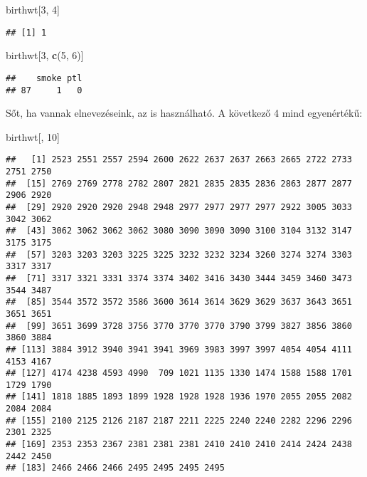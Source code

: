 \documentclass[]{book}
\newenvironment{Shaded}{\begin{snugshade}}{\end{snugshade}}
\newcommand{\DecValTok}[1]{\textcolor[rgb]{0.00,0.00,0.81}{#1}}
\newcommand{\KeywordTok}[1]{\textcolor[rgb]{0.13,0.29,0.53}{\textbf{#1}}}
\newcommand{\NormalTok}[1]{#1}
\begin{document}
\begin{Shaded}
\begin{Highlighting}[]
\NormalTok{birthwt[}\DecValTok{3}\NormalTok{, }\DecValTok{4}\NormalTok{]}
\end{Highlighting}
\end{Shaded}

\begin{verbatim}
## [1] 1
\end{verbatim}

\begin{Shaded}
\begin{Highlighting}[]
\NormalTok{birthwt[}\DecValTok{3}\NormalTok{, }\KeywordTok{c}\NormalTok{(}\DecValTok{5}\NormalTok{, }\DecValTok{6}\NormalTok{)]}
\end{Highlighting}
\end{Shaded}

\begin{verbatim}
##    smoke ptl
## 87     1   0
\end{verbatim}

Sőt, ha vannak elnevezéseink, az is használható. A következő 4 mind egyenértékű:

\begin{Shaded}
\begin{Highlighting}[]
\NormalTok{birthwt[, }\DecValTok{10}\NormalTok{]}
\end{Highlighting}
\end{Shaded}

\begin{verbatim}
##   [1] 2523 2551 2557 2594 2600 2622 2637 2637 2663 2665 2722 2733 2751 2750
##  [15] 2769 2769 2778 2782 2807 2821 2835 2835 2836 2863 2877 2877 2906 2920
##  [29] 2920 2920 2920 2948 2948 2977 2977 2977 2977 2922 3005 3033 3042 3062
##  [43] 3062 3062 3062 3062 3080 3090 3090 3090 3100 3104 3132 3147 3175 3175
##  [57] 3203 3203 3203 3225 3225 3232 3232 3234 3260 3274 3274 3303 3317 3317
##  [71] 3317 3321 3331 3374 3374 3402 3416 3430 3444 3459 3460 3473 3544 3487
##  [85] 3544 3572 3572 3586 3600 3614 3614 3629 3629 3637 3643 3651 3651 3651
##  [99] 3651 3699 3728 3756 3770 3770 3770 3790 3799 3827 3856 3860 3860 3884
## [113] 3884 3912 3940 3941 3941 3969 3983 3997 3997 4054 4054 4111 4153 4167
## [127] 4174 4238 4593 4990  709 1021 1135 1330 1474 1588 1588 1701 1729 1790
## [141] 1818 1885 1893 1899 1928 1928 1928 1936 1970 2055 2055 2082 2084 2084
## [155] 2100 2125 2126 2187 2187 2211 2225 2240 2240 2282 2296 2296 2301 2325
## [169] 2353 2353 2367 2381 2381 2381 2410 2410 2410 2414 2424 2438 2442 2450
## [183] 2466 2466 2466 2495 2495 2495 2495
\end{verbatim}
\end{document}
